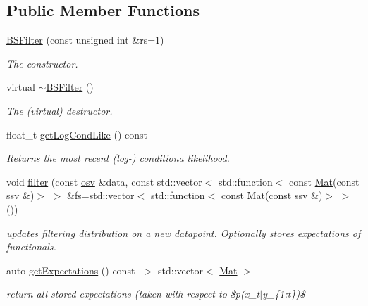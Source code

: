 \subsection*{Public Member Functions}
\begin{DoxyCompactItemize}
\item 
\hyperlink{classBSFilter_a49614246ae7b55b04b9e232cd4fb6bc1}{B\+S\+Filter} (const unsigned int \&rs=1)
\begin{DoxyCompactList}\small\item\em The constructor. \end{DoxyCompactList}\item 
\mbox{\label{classBSFilter_a29848932b9da3b16de1b3c99735de478}} 
virtual \hyperlink{classBSFilter_a29848932b9da3b16de1b3c99735de478}{$\sim$\+B\+S\+Filter} ()
\begin{DoxyCompactList}\small\item\em The (virtual) destructor. \end{DoxyCompactList}\item 
float\+\_\+t \hyperlink{classBSFilter_a6ab6ad2b7b5bd26d8f57af71e560f0a7}{get\+Log\+Cond\+Like} () const
\begin{DoxyCompactList}\small\item\em Returns the most recent (log-\/) conditiona likelihood. \end{DoxyCompactList}\item 
void \hyperlink{classBSFilter_a651d0228e8477c0ca7d522cd72908a57}{filter} (const \hyperlink{classBSFilter_ad8512328484d7c7bd7a3b7a9481d7f37}{osv} \&data, const std\+::vector$<$ std\+::function$<$ const \hyperlink{classBSFilter_a8ec8e8477e12686e706e7d7aa5c2971c}{Mat}(const \hyperlink{classBSFilter_a0b5bc93957fb6b6b1282f31fa2e01c3c}{ssv} \&)$>$ $>$ \&fs=std\+::vector$<$ std\+::function$<$ const \hyperlink{classBSFilter_a8ec8e8477e12686e706e7d7aa5c2971c}{Mat}(const \hyperlink{classBSFilter_a0b5bc93957fb6b6b1282f31fa2e01c3c}{ssv} \&)$>$ $>$())
\begin{DoxyCompactList}\small\item\em updates filtering distribution on a new datapoint. Optionally stores expectations of functionals. \end{DoxyCompactList}\item 
auto \hyperlink{classBSFilter_af0750c5880c1e5254cfd18157a623915}{get\+Expectations} () const -\/$>$ std\+::vector$<$ \hyperlink{classBSFilter_a8ec8e8477e12686e706e7d7aa5c2971c}{Mat} $>$
\begin{DoxyCompactList}\small\item\em return all stored expectations (taken with respect to \$p(x\+\_\+t$\vert$y\+\_\+\{1\+:t\})\$ \end{DoxyCompactList}\item 

\end{DoxyCompactItemize}
